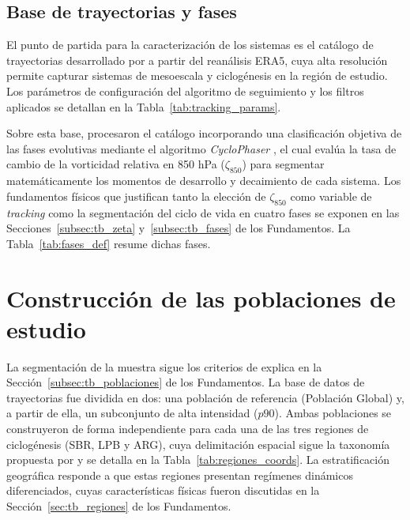 \subsection{Base de trayectorias y fases}\label{sec:bd_ciclones}
El punto de partida para la caracterización de los sistemas es el catálogo de trayectorias desarrollado por \citet{gramcianinov2019properties} a partir del reanálisis ERA5, cuya alta resolución permite capturar sistemas de mesoescala y ciclogénesis en la región de estudio. 
Los parámetros de configuración del algoritmo de seguimiento y los filtros aplicados se detallan en la Tabla~\ref{tab:tracking_params}.



Sobre esta base, \citet{coutodesouza2024new} procesaron el catálogo incorporando una clasificación objetiva de las fases evolutivas mediante el algoritmo \textit{CycloPhaser} \citep{deSouza2025CycloPhaser}, el cual evalúa la tasa de cambio de la vorticidad relativa en 850 hPa ($\zeta_{850}$) para segmentar matemáticamente los momentos de desarrollo y decaimiento de cada sistema. 
Los fundamentos físicos que justifican tanto la elección de $\zeta_{850}$ como variable de \textit{tracking} como la segmentación del ciclo de vida en cuatro fases se exponen en las Secciones~\ref{subsec:tb_zeta} y~\ref{subsec:tb_fases} de los Fundamentos. La Tabla~\ref{tab:fases_def} resume dichas fases.




\section{Construcción de las poblaciones de estudio}\label{sec:poblaciones_estudio}

La segmentación de la muestra sigue los criterios de explica en la Sección~\ref{subsec:tb_poblaciones} de los Fundamentos. 
La base de datos de trayectorias fue dividida en dos: una población de referencia (Población Global) y, a partir de ella, un subconjunto de alta intensidad ($p90$). 
Ambas poblaciones se construyeron de forma independiente para cada una de las tres regiones de ciclogénesis (SBR, LPB y ARG), cuya delimitación espacial sigue la taxonomía propuesta por \citet{gramcianinov2019properties} y se detalla en la Tabla~\ref{tab:regiones_coords}. 
La estratificación geográfica responde a que estas regiones presentan regímenes dinámicos diferenciados, cuyas características físicas fueron discutidas en la Sección~\ref{sec:tb_regiones} de los Fundamentos.

